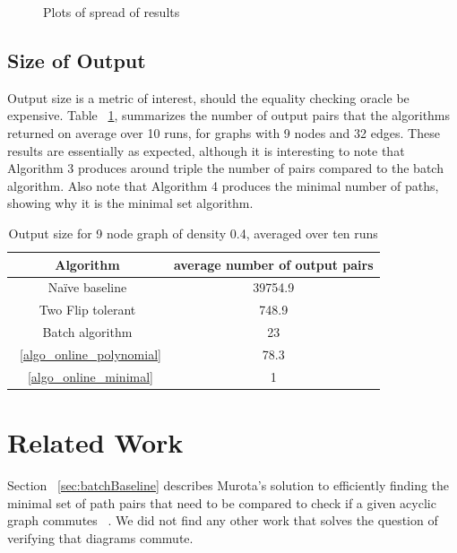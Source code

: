 \documentclass[sigplan,review]{acmart}
\begin{document}
{\begin{figure}

    \caption{Plots of spread of results}
    \label{fig:variance}
\end{figure}

\subsection{Size of Output}
Output size is a metric of interest, should the equality checking oracle be expensive.
Table ~\ref{tab:sizes}, summarizes the number of output pairs that the algorithms returned on average over 10 runs, for graphs with 9 nodes and 32 edges.
These results are essentially as expected, although it is interesting to note that Algorithm 3 produces around triple the number of pairs compared to the batch algorithm.
Also note that Algorithm 4 produces the minimal number of paths, showing why it is the minimal set algorithm.

\begin{table}
\begin{tabular}{|c|c|}
    \hline
    Algorithm & average number of output pairs \\
    \hline
    Na\"{i}ve baseline & 39754.9 \\
    Two Flip tolerant & 748.9 \\
    Batch algorithm & 23 \\
    ~\ref{algo_online_polynomial} & 78.3 \\
    ~\ref{algo_online_minimal} & 1 \\
    \hline
\end{tabular}
\caption{Output size for 9 node graph of density 0.4, averaged over ten runs}
\label{tab:sizes}
\end{table}

\section{Related Work}

Section ~\ref{sec:batchBaseline} describes Murota's solution to efficiently finding the minimal set of path pairs that need to be compared to check if a given acyclic graph commutes ~\cite{commutative}.
We did not find any other work that solves the question of verifying that diagrams commute.

}
\end{document}
